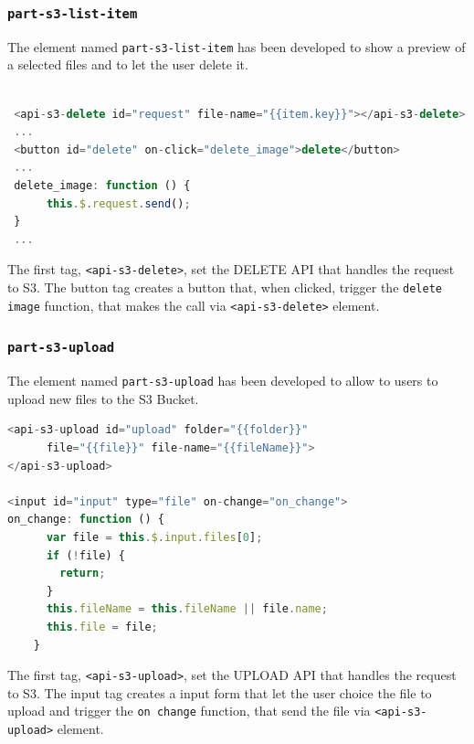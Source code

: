 \subsubsection{\texttt{part-s3-list-item}}
\label{part-s3-list-item}
The element named \texttt{part-s3-list-item} has been developed to show a preview of a selected files and to let the user delete it.
\begin{lstlisting}[language=javascript]

 <api-s3-delete id="request" file-name="{{item.key}}"></api-s3-delete>
 ...
 <button id="delete" on-click="delete_image">delete</button>
 ...
 delete_image: function () {
      this.$.request.send();
 }
 ...
\end{lstlisting}

The first tag, \texttt{<api-s3-delete>}, set the DELETE API that handles the request to S3.
The button tag creates a button that, when clicked, trigger the \texttt{delete image} function, that makes the call via \texttt{<api-s3-delete>} element.


\subsubsection{\texttt{part-s3-upload}}
\label{part-s3-upload}
The element named \texttt{part-s3-upload} has been developed to allow to users to upload new files to the S3 Bucket.

\begin{lstlisting}[language=javascript]
<api-s3-upload id="upload" folder="{{folder}}"
      file="{{file}}" file-name="{{fileName}}">
</api-s3-upload>

<input id="input" type="file" on-change="on_change">
on_change: function () {
      var file = this.$.input.files[0];
      if (!file) {
        return;
      }
      this.fileName = this.fileName || file.name;
      this.file = file;
    }

\end{lstlisting}

The first tag, \texttt{<api-s3-upload>}, set the UPLOAD API that handles the request to S3.
The input tag creates a input form that let the user choice the file to upload and trigger the \texttt{on change} function, that send the file via \texttt{<api-s3-upload>} element.
